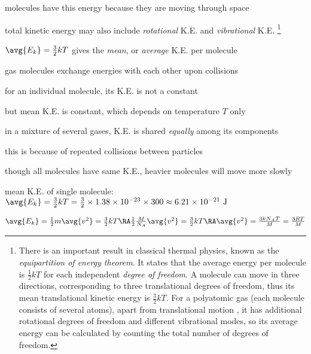 molecules have this energy because they are moving through space

total kinetic energy may also include \emph{rotational} K.E. and \emph{vibrational} K.E.
\footnote{There is an important result in classical thermal physics, known as the \emph{equipartition of energy theorem}. It states that the average energy per molecule is $\frac{1}{2}kT$ for each independent \emph{degree of freedom}. A molecule can move in three directions, corresponding to three translational degrees of freedom, thus its mean translational kinetic energy is $\frac{3}{2}kT$. For a polyatomic gas (each molecule consists of several atoms), apart from translational motion , it has additional rotational degrees of freedom and different vibrational modes, so its average energy can be calculated by counting the total number of degrees of freedom.}

\cmt $\avg{E_k} = \frac{3}{2}k T$ gives the \emph{mean}, or \emph{average} K.E. per molecule

gas molecules exchange energies with each other upon collisions

for an individual molecule, its K.E. is not a constant

but mean K.E. is constant, which depends on temperature $T$ only

\cmt in a mixture of several gases, K.E. is shared \emph{equally} among its components

this is because of repeated collisions between particles

though all molecules have same K.E., heavier molecules will move more slowly





\sol mean K.E. of single molecule: $\avg{E_k} = \frac{3}{2}kT = \frac{3}{2} \times 1.38\times10^{-23} \times 300 \approx 6.21\times 10^{-21} \text{ J}$

{
	
	\centering
	
	$\avg{E_k} = \frac{1}{2}m\avg{v^2} = \frac{3}{2} kT \RA \frac{1}{2} \frac{M}{N_A} \avg{v^2} = \frac{3}{2} kT \RA \avg{v^2} = \frac{3kN_AT}{M} = \frac{3RT}{M}$
	
}

